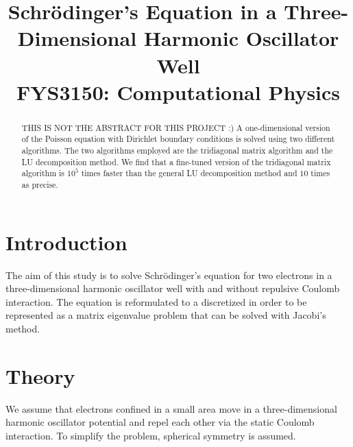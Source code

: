\documentclass[10pt, a4paper]{amsart}
\title[Schrödinger's Equation in 3D]{Schrödinger's Equation in a Three-Dimensional Harmonic Oscillator Well \\
  \hrulefill\small{ FYS3150: Computational Physics }\hrulefill}
\begin{document}
\begin{titlepage}
\begin{abstract}
THIS IS NOT THE ABSTRACT FOR THIS PROJECT :)
A one-dimensional version of the Poisson equation with Dirichlet boundary conditions is solved using two different algorithms. The two algorithms employed are the tridiagonal matrix algorithm and the LU decomposition method. We find that a fine-tuned version of the tridiagonal matrix algorithm is $10^5$ times faster than the general LU decomposition method and $10$ times as precise.
\end{abstract}
\maketitle
\tableofcontents
\end{titlepage}

\section{Introduction}

The aim of this study is to solve Schrödinger's equation for two electrons in a three-dimensional  harmonic oscillator well with and without repulsive Coulomb interaction. The equation is reformulated to a discretized in order to be represented as a matrix eigenvalue problem that can be solved with Jacobi's method. 

\section{Theory}
We assume that electrons confined in a small area move in a three-dimensional harmonic oscillator potential and repel each other via the static Coulomb interaction. To simplify the problem, spherical symmetry is assumed. 
\end{document}
